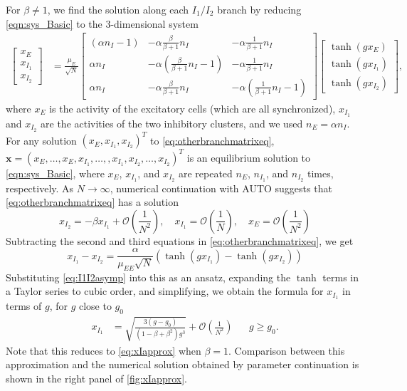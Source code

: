 \documentclass[11pt,reqno]{amsart}
\newcommand{\xvec}{\mathbf{x}}
\begin{document}
For $\beta \neq 1$, we find the solution along each $I_1/I_2$ branch by reducing \cref{eqn:sys_Basic} to the 3-dimensional system
\begin{equation}\label{eq:otherbranchmatrixeq}
 \begin{aligned}
 \begin{bmatrix} x_E\\x_{I_1}\\x_{I_2}\end{bmatrix} 
 &= \frac{\mu_E}{\sqrt{N}} 
 \begin{bmatrix} (\alpha n_I - 1) & -\alpha \frac{\beta}{\beta+1} n_I & - \alpha \frac{1}{\beta+1} n_I  \\
    \alpha n_I  & -\alpha \left(\frac{\beta}{\beta+1} n_I-1\right) & - \alpha \frac{1}{\beta+1} n_I  \\
    \alpha n_I & -\alpha \frac{\beta}{\beta+1} n_I & -\alpha \left(\frac{1}{\beta+1} n_I-1\right)
 \end{bmatrix}
 \begin{bmatrix} \tanh(g x_E) \\\tanh ( g x_{I_1} ) \\\tanh(g x_{I_2})\end{bmatrix},
 \end{aligned}
 \end{equation}
 where $x_E$ is the activity of the excitatory cells (which are all synchronized), $x_{I_1}$ and $x_{I_2}$ are the activities of the two inhibitory clusters, and we used $n_E = \alpha n_I$. For any solution $(x_E, x_{I_1}, x_{I_2})^T$ to \cref{eq:otherbranchmatrixeq}, $\xvec = (x_E, \dots, x_E, x_{I_1}, \dots, , x_{I_1}, x_{I_2}, \dots, x_{I_2})^T$ is an equilibrium solution to \cref{eqn:sys_Basic}, where $x_E$, $x_{I_1}$, and $x_{I_2}$ are repeated $n_E$, $n_{I_1}$, and $n_{I_2}$ times, respectively. As $N \rightarrow \infty$, numerical continuation with AUTO suggests that \cref{eq:otherbranchmatrixeq} has a solution
\begin{equation}\label{eq:I1I2asymp}
    x_{I_2} = -\beta x_{I_1} + \mathcal{O}\left( \frac{1}{N^2} \right), \quad 
    x_{I_1} = \mathcal{O}\left( \frac{1}{N} \right), \quad
     x_E = \mathcal{O}\left( \frac{1}{N^2} \right)
\end{equation}
Subtracting the second and third equations in \cref{eq:otherbranchmatrixeq}, we get
\[
 x_{I_1} - x_{I_2} = \frac{\alpha}{\mu_{EE}\sqrt{N}}\left( \tanh(g x_{I_1}) - \tanh(g x_{I_2}) \right)
 \]
Substituting \cref{eq:I1I2asymp} into this as an ansatz, expanding the $\tanh$ terms in a Taylor series to cubic order, and simplifying, we obtain the formula for $x_{I_1}$ in terms of $g$, for $g$ close to $g_0$
 \begin{align}\label{eq:XI1}
 x_{I_1} &= \sqrt{ \frac{ 3(g - g_0) }{ (1 - \beta + \beta^2 )g^3}} + \mathcal{O}\left( \frac{1}{N^2}\right)&& g \geq g_0.
\end{align}
Note that this reduces to \cref{eq:xIapprox} when $\beta = 1$. Comparison between this approximation and the numerical solution obtained by parameter continuation is shown in the right panel of \cref{fig:xIapprox}.
\end{document}
